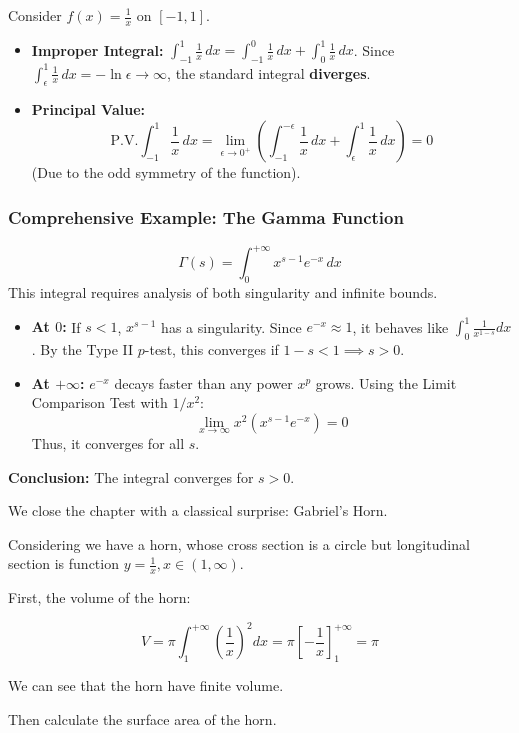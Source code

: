 \begin{example}
Consider $f(x) = \frac{1}{x}$ on $[-1, 1]$.
\begin{itemize}
    \item \textbf{Improper Integral:} $\int_{-1}^1 \frac{1}{x} \, dx = \int_{-1}^0 \frac{1}{x} \, dx + \int_0^1 \frac{1}{x} \, dx$.
    Since $\int_{\epsilon}^1 \frac{1}{x} \, dx = -\ln \epsilon \to \infty$, the standard integral \textbf{diverges}.
    \item \textbf{Principal Value:}
    \[
    \text{P.V.} \int_{-1}^1 \frac{1}{x} \, dx = \lim_{\epsilon \to 0^+} \left( \int_{-1}^{-\epsilon} \frac{1}{x} \, dx + \int_{\epsilon}^1 \frac{1}{x} \, dx \right) = 0
    \]
    (Due to the odd symmetry of the function).
\end{itemize}
\end{example}

\subsubsection{Comprehensive Example: The Gamma Function}
\[
\Gamma(s) = \int_0^{+\infty} x^{s-1} e^{-x} \, dx
\]
This integral requires analysis of both singularity and infinite bounds.
\begin{itemize}
    \item \textbf{At $0$:} If $s < 1$, $x^{s-1}$ has a singularity. Since $e^{-x} \approx 1$, it behaves like $\int_0^1 \frac{1}{x^{1-s}} dx$. By the Type II $p$-test, this converges if $1-s < 1 \implies s > 0$.
    \item \textbf{At $+\infty$:} $e^{-x}$ decays faster than any power $x^p$ grows. Using the Limit Comparison Test with $1/x^2$:
    \[
    \lim_{x \to \infty} x^2 (x^{s-1} e^{-x}) = 0
    \]
    Thus, it converges for all $s$.
\end{itemize}
\textbf{Conclusion:} The integral converges for $s > 0$.

We close the chapter with a classical surprise: Gabriel's Horn.

Considering we have a horn, whose cross section is a circle but longitudinal section is function $y = \frac{1}{x}, x \in (1,\infty)$.

First, the volume of the horn:

\[V = \pi \int_{1}^{+\infty} (\frac{1}{x})^2 dx = \pi [-\frac{1}{x}]_{1}^{+\infty} = \pi\]

We can see that the horn have finite volume.

Then calculate the surface area of the horn.

